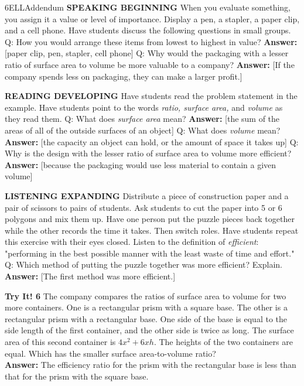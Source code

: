 \documentclass{article}
\newenvironment{tryit}[1]{\textbf{Try It! #1}}{}
\newenvironment{te-addendum}[2]{\textbf{TE (#1 - #2)}}{}
\newcommand{\answer}[1]{\textbf{Answer:} #1}
\begin{document}
\begin{te-addendum}{6}{ELLAddendum}
\textbf{SPEAKING BEGINNING}
When you evaluate something, you assign it a value or level of importance. Display a pen, a stapler, a paper clip, and a cell phone. Have students discuss the following questions in small groups.
Q: How you would arrange these items from lowest to highest in value?
\answer{[paper clip, pen, stapler, cell phone]}
Q: Why would the packaging with a lesser ratio of surface area to volume be more valuable to a company?
\answer{[If the company spends less on packaging, they can make a larger profit.]}

\textbf{READING DEVELOPING}
Have students read the problem statement in the example. Have students point to the words \textit{ratio, surface area,} and \textit{volume} as they read them.
Q: What does \textit{surface area} mean?
\answer{[the sum of the areas of all of the outside surfaces of an object]}
Q: What does \textit{volume} mean?
\answer{[the capacity an object can hold, or the amount of space it takes up]}
Q: Why is the design with the lesser ratio of surface area to volume more efficient?
\answer{[because the packaging would use less material to contain a given volume]}

\textbf{LISTENING EXPANDING}
Distribute a piece of construction paper and a pair of scissors to pairs of students. Ask students to cut the paper into 5 or 6 polygons and mix them up. Have one person put the puzzle pieces back together while the other records the time it takes. Then switch roles. Have students repeat this exercise with their eyes closed. Listen to the definition of \textit{efficient}: "performing in the best possible manner with the least waste of time and effort."
Q: Which method of putting the puzzle together was more efficient? Explain.
\answer{[The first method was more efficient.]}
\end{te-addendum}

\begin{tryit}{6}
The company compares the ratios of surface area to volume for two more containers. One is a rectangular prism with a square base. The other is a rectangular prism with a rectangular base. One side of the base is equal to the side length of the first container, and the other side is twice as long. The surface area of this second container is $4x^2 + 6xh$. The heights of the two containers are equal. Which has the smaller surface area-to-volume ratio? \\
\answer{The efficiency ratio for the prism with the rectangular base is less than that for the prism with the square base.}
\end{tryit}
\end{document}
